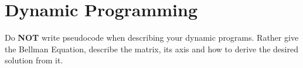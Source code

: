 \documentclass[solutionbox,answers]{exam}
\begin{document}
\begin{center}
\setlength{\fboxsep}{10pt}
\end{center}
\vspace{0.1in}
 \qquad
{}

\section*{Dynamic Programming}

Do \textbf{NOT} write pseudocode when describing your dynamic programs. Rather give the Bellman Equation, describe the matrix, its axis and how to derive the desired solution from it.
\end{document}
